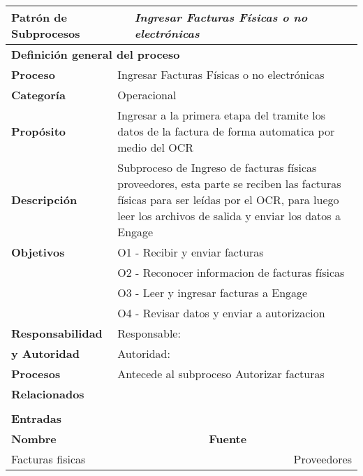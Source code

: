 \begin{longtable}{|llrrrrrr|}
	\hline
	\multicolumn{2}{|l|}{\textbf{Patrón de Subprocesos}} & \multicolumn{6}{|l|}{\textit{Ingresar Facturas Físicas o no electrónicas}} \\ \hline
	\multicolumn{8}{|l|}{\textbf{Definición general del proceso}} \\ \hline
	\textbf{Proceso} & \multicolumn{7}{|m{12cm}|}{Ingresar Facturas Físicas o no electrónicas} \\ \hline
	\textbf{Categoría} & \multicolumn{7}{|m{12cm}|}{Operacional} \\ \hline
	\textbf{Propósito} & \multicolumn{7}{|m{12cm}|}{Ingresar a la primera etapa del tramite los datos de la factura de forma automatica por medio del OCR} \\ \hline
    \textbf{Descripción} & \multicolumn{7}{|m{12cm}|}{Subproceso de Ingreso de facturas físicas proveedores, esta parte se reciben las facturas físicas para ser leídas por el OCR, para luego leer los archivos de salida y enviar los datos a Engage} \\ \hline
	\multirow{0}[6]{*}{\textbf{Objetivos}} 
          & \multicolumn{7}{|l|}{O1 - Recibir y enviar facturas } \\ \cline{2-8}
          & \multicolumn{7}{|l|}{O2 - Reconocer informacion de facturas físicas } \\ \cline{2-8}
          & \multicolumn{7}{|l|}{O3 - Leer y ingresar facturas a Engage} \\ \cline{2-8}
          & \multicolumn{7}{|l|}{O4 - Revisar datos y enviar a autorizacion } \\ \hline
    \multicolumn{1}{|l|}{\textbf{Responsabilidad}} 	& \multicolumn{7}{|l|}{Responsable: } \\
	\multicolumn{1}{|l|}{\textbf{y Autoridad}} 	& \multicolumn{7}{|l|}{Autoridad: } \\ \hline
    \multicolumn{1}{|l|}{\textbf{Procesos}} 	& \multicolumn{7}{|m{12cm}|}{Antecede al subproceso Autorizar facturas} \\
	\multicolumn{1}{|l|}{\textbf{Relacionados}} 	&  \multicolumn{7}{|m{12cm}|}{} \\ \hline
          &       &       &       &       &       &       &  \\ \hline
    \multicolumn{8}{|l|}{\textbf{Entradas}} \\ \hline
    \multicolumn{5}{|l|}{\textbf{Nombre}}   & \multicolumn{3}{|l|}{\textbf{Fuente}} \\ \hline
    \multicolumn{5}{|l|}{Facturas fisicas} & \multicolumn{3}{|m{3.5cm}|}{Proveedores} \\  \hline

\end{longtable}
